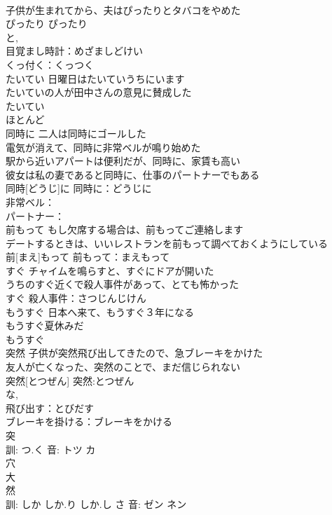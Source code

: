 \documentclass[8pt]{extreport}
\begin{document}
\begin{CJK}{UTF8}{min}
\\	子供が生まれてから、夫はぴったりとタバコをやめた 
\\	ぴったり			ぴったり
\\	と, 
\\	目覚まし時計：めざましどけい
\\	くっ付く：くっつく
\\	たいてい	日曜日はたいていうちにいます 
\\	たいていの人が田中さんの意見に賛成した 
\\	たいてい			
\\	ほとんど 
\\	同時に	二人は同時にゴールした 
\\	電気が消えて、同時に非常ベルが鳴り始めた 
\\	駅から近いアパートは便利だが、同時に、家賃も高い 
\\	彼女は私の妻であると同時に、仕事のパートナーでもある 
\\	同時[どうじ]に			同時に：どうじに
\\	非常ベル：
\\	パートナー：
\\	前もって	もし欠席する場合は、前もってご連絡します 
\\	デートするときは、いいレストランを前もって調べておくようにしている 
\\	前[まえ]もって			前もって：まえもって
\\	すぐ	チャイムを鳴らすと、すぐにドアが開いた 
\\	うちのすぐ近くで殺人事件があって、とても怖かった 
\\	すぐ			殺人事件：さつじんじけん
\\	もうすぐ	日本へ来て、もうすぐ３年になる 
\\	もうすぐ夏休みだ 
\\	もうすぐ						
\\	突然	子供が突然飛び出してきたので、急ブレーキをかけた 
\\	友人が亡くなった、突然のことで、まだ信じられない 
\\	突然[とつぜん]			突然:とつぜん
\\	な, 
\\	飛び出す：とびだす
\\	ブレーキを掛ける：ブレーキをかける
\\	突 
\\	訓: つ.く 音: トツ カ 
\\	穴 
\\	大 
\\	然 
\\	訓: しか しか.り しか.し さ 音: ゼン ネン 

\end{CJK}
\end{document}
